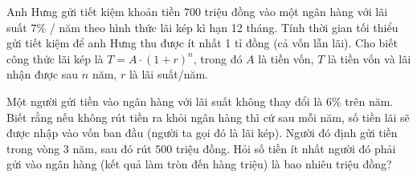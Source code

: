 \begin{ex}%
	Anh Hưng gửi tiết kiệm khoản tiền 700 triệu đồng vào một ngân hàng  với lãi suất $7\%$ / năm theo hình thức lãi kép kì hạn 12 tháng. Tính thời gian tối thiểu gửi tiết kiệm để anh Hưng thu được ít nhất 1 tỉ đồng (cả vốn lẫn lãi). Cho biết công thức lãi kép là $T=A\cdot (1+r)^n$, trong đó $A$ là tiền vốn, $T$ là tiền vốn và lãi nhận được sau $n$ năm, $r$ là lãi suất/năm.
\end{ex}

\begin{ex}%
	Một người gửi tiền vào ngân hàng với lãi suất không thay đổi là $ 6\% $ trên năm. Biết rằng nếu không rút tiền ra khỏi ngân hàng thì cứ sau mỗi năm, số tiền lãi sẽ được nhập  vào vốn ban đầu (người ta gọi đó là lãi kép). Người đó định gửi tiền trong vòng $ 3 $ năm, sau đó rút $ 500 $ triệu đồng. Hỏi số tiền ít nhất người đó phải gửi vào ngân hàng (kết quả làm tròn đến hàng triệu) là bao nhiêu triệu đồng?
\end{ex}


